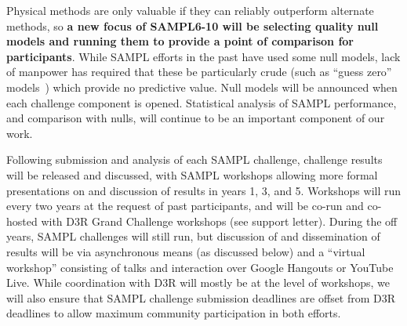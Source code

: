 \documentclass[11pt]{article}
\begin{document}
Physical methods are only valuable if they can reliably outperform alternate methods, so \textbf{a new focus of SAMPL6-10 will be selecting quality null models and running them to provide a point of comparison for participants}.
While SAMPL efforts in the past have used some null models, lack of manpower has required that these be particularly crude (such as ``guess zero'' models~\cite{bannan_blind_2016, paranahewage_predicting_2016, muddana_sampl4_2014}) which provide no predictive value. 
Null models will be announced when each challenge component is opened.
Statistical analysis of SAMPL performance, and comparison with nulls, will continue to be an important component of our work.

Following submission and analysis of each SAMPL challenge, challenge results will be released and discussed, with SAMPL workshops allowing more formal presentations on and discussion of results in years 1, 3, and 5. 
Workshops will run every two years at the request of past participants, and will be co-run and co-hosted with D3R Grand Challenge workshops (see support letter).
During the off years, SAMPL challenges will still run, but discussion of and dissemination of results will be via asynchronous means (as discussed below) and a ``virtual workshop'' consisting of talks and interaction over Google Hangouts or YouTube Live.
While coordination with D3R will mostly be at the level of workshops, we will also ensure that SAMPL challenge submission deadlines are offset from D3R deadlines to allow maximum community participation in both efforts.
\end{document}
